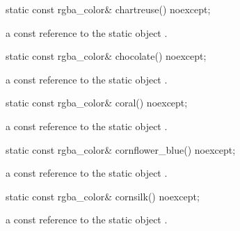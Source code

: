 \begin{itemdecl}
    static const rgba_color& chartreuse() noexcept;
\end{itemdecl}
\begin{itemdescr}
    \pnum
    \returns
    a const reference to the static  object .
\end{itemdescr}

\begin{itemdecl}
    static const rgba_color& chocolate() noexcept;
\end{itemdecl}
\begin{itemdescr}
    \pnum
    \returns
    a const reference to the static  object .
\end{itemdescr}

\begin{itemdecl}
    static const rgba_color& coral() noexcept;
\end{itemdecl}
\begin{itemdescr}
    \pnum
    \returns
    a const reference to the static  object .
\end{itemdescr}

\begin{itemdecl}
    static const rgba_color& cornflower_blue() noexcept;
\end{itemdecl}
\begin{itemdescr}
    \pnum
    \returns
    a const reference to the static  object .
\end{itemdescr}

\begin{itemdecl}
    static const rgba_color& cornsilk() noexcept;
\end{itemdecl}
\begin{itemdescr}
    \pnum
    \returns
    a const reference to the static  object .
\end{itemdescr}

